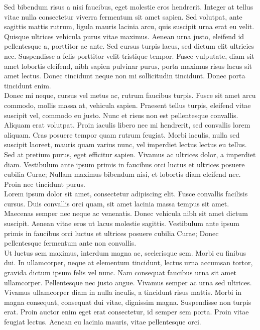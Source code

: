 Sed bibendum risus a nisi faucibus, eget molestie eros hendrerit. Integer at tellus vitae nulla consectetur viverra fermentum sit amet sapien. Sed volutpat, ante sagittis mattis rutrum, ligula mauris lacinia arcu, quis suscipit urna erat eu velit. Quisque ultrices vehicula purus vitae maximus. Aenean urna justo, eleifend id pellentesque a, porttitor ac ante. Sed cursus turpis lacus, sed dictum elit ultricies nec. Suspendisse a felis porttitor velit tristique tempor. Fusce vulputate, diam sit amet lobortis eleifend, nibh sapien pulvinar purus, porta maximus risus lacus sit amet lectus. Donec tincidunt neque non mi sollicitudin tincidunt. Donec porta tincidunt enim.
\\

Donec mi neque, cursus vel metus ac, rutrum faucibus turpis. Fusce sit amet arcu commodo, mollis massa at, vehicula sapien. Praesent tellus turpis, eleifend vitae suscipit vel, commodo eu justo. Nunc et risus non est pellentesque convallis. Aliquam erat volutpat. Proin iaculis libero nec mi hendrerit, sed convallis lorem aliquam. Cras posuere tempor quam rutrum feugiat. Morbi iaculis, nulla sed suscipit laoreet, mauris quam varius nunc, vel imperdiet lectus lectus eu tellus. Sed at pretium purus, eget efficitur sapien. Vivamus ac ultrices dolor, a imperdiet diam. Vestibulum ante ipsum primis in faucibus orci luctus et ultrices posuere cubilia Curae; Nullam maximus bibendum nisi, et lobortis diam eleifend nec. Proin nec tincidunt purus.
\\


Lorem ipsum dolor sit amet, consectetur adipiscing elit. Fusce convallis facilisis cursus. Duis convallis orci quam, sit amet lacinia massa tempus sit amet. Maecenas semper nec neque ac venenatis. Donec vehicula nibh sit amet dictum suscipit. Aenean vitae eros ut lacus molestie sagittis. Vestibulum ante ipsum primis in faucibus orci luctus et ultrices posuere cubilia Curae; Donec pellentesque fermentum ante non convallis.
\\

Ut luctus sem maximus, interdum magna ac, scelerisque sem. Morbi eu finibus dui. In ullamcorper, neque at elementum tincidunt, lectus urna accumsan tortor, gravida dictum ipsum felis vel nunc. Nam consequat faucibus urna sit amet ullamcorper. Pellentesque nec justo augue. Vivamus semper ac urna sed ultrices. Vivamus ullamcorper diam in nulla iaculis, a tincidunt risus mattis. Morbi in magna consequat, consequat dui vitae, dignissim magna. Suspendisse non turpis erat. Proin auctor enim eget erat consectetur, id semper sem porta. Proin vitae feugiat lectus. Aenean eu lacinia mauris, vitae pellentesque orci.
\\

